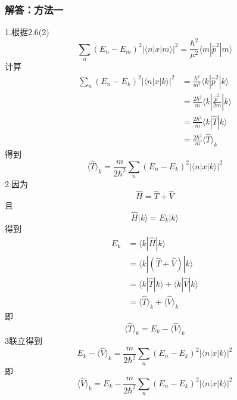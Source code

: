\subsubsection{解答：方法一}
1.根据2.6(2)
\begin{equation}
    \sum_n{\left( E_n-E_m \right) ^2}\left| \langle n|x|m\rangle \right|^2=\frac{\hbar ^2}{\mu ^2}\langle m|\hat{p}^2|m\rangle 
\end{equation}
计算
\begin{equation}
    \begin{aligned}
        \sum_n{\left( E_n-E_k \right) ^2}\left| \langle n|x|k\rangle \right|^2&=\frac{\hbar ^2}{m^2}\langle k|\hat{p}^2|k\rangle 
\\
&=\frac{2\hbar ^2}{m}\langle k|\frac{\hat{p}^2}{2m}|k\rangle 
\\
&=\frac{2\hbar ^2}{m}\langle k|\hat{T}|k\rangle 
\\
&=\frac{2\hbar ^2}{m}\langle \hat{T}\rangle _k
    \end{aligned}
\end{equation}
得到
\begin{equation}
    \langle \hat{T}\rangle _k=\frac{m}{2\hbar ^2}\sum_n{\left( E_n-E_k \right) ^2}\left| \langle n|x|k\rangle \right|^2
\end{equation}
2.因为
\begin{equation}
    \hat{H}=\hat{T}+\hat{V}
\end{equation}
且
\begin{equation}
    \hat{H}|k\rangle =E_k|k\rangle 
\end{equation}
得到
\begin{equation}
    \begin{aligned}
        E_k &=\langle k|\hat{H}|k\rangle 
\\
&=\langle k|\left( \hat{T}+\hat{V} \right) |k\rangle 
\\
&=\langle k|\hat{T}|k\rangle +\langle k|\hat{V}|k\rangle 
\\
&=\langle \hat{T}\rangle _k+\langle \hat{V}\rangle _k
    \end{aligned}
\end{equation}
即
\begin{equation}
    \langle \hat{T}\rangle _k=E_k-\langle \hat{V}\rangle _k
\end{equation}
3联立得到
\begin{equation}
    E_k-\langle \hat{V}\rangle _k=\frac{m}{2\hbar ^2}\sum_n{\left( E_n-E_k \right) ^2}\left| \langle n|x|k\rangle \right|^2
\end{equation}
即
\begin{equation}
    \langle \hat{V}\rangle _k=E_k-\frac{m}{2\hbar ^2}\sum_n{\left( E_n-E_k \right) ^2}\left| \langle n|x|k\rangle \right|^2
\end{equation}

